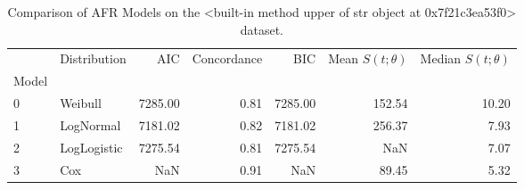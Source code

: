 \begin{table}
\caption{Comparison of AFR Models on the <built-in method upper of str object at 0x7f21c3ea53f0> dataset.}
\label{tab:mnist}
\begin{tabular}{llrrrrr}
\toprule
 & Distribution & AIC & Concordance & BIC & Mean $S(t;\theta)$ & Median $S(t;\theta)$ \\
Model &  &  &  &  &  &  \\
\midrule
0 & Weibull & 7285.00 & 0.81 & 7285.00 & 152.54 & 10.20 \\
1 & LogNormal & 7181.02 & 0.82 & 7181.02 & 256.37 & 7.93 \\
2 & LogLogistic & 7275.54 & 0.81 & 7275.54 & NaN & 7.07 \\
3 & Cox & NaN & 0.91 & NaN & 89.45 & 5.32 \\
\bottomrule
\end{tabular}
\end{table}
